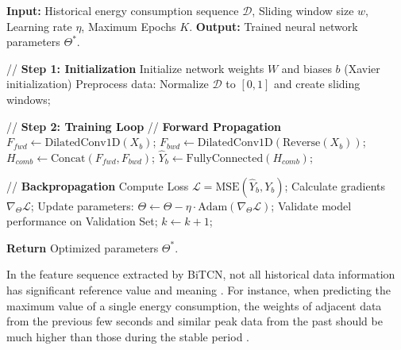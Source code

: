 \documentclass[conference]{{IEEEtran}}
\begin{document}
\begin{algorithm}[!t] 
\caption{Training Process of the BiTCN Energy Consumption Prediction Model}
\label{alg:bitcn_training}
\begin{algorithmic}[1]
\State \textbf{Input:} Historical energy consumption sequence $\mathcal{D}$, Sliding window size $w$, Learning rate $\eta$, Maximum Epochs $K$.
\State \textbf{Output:} Trained neural network parameters $\Theta^*$.

// \textbf{Step 1: Initialization}
\State Initialize network weights $W$ and biases $b$ (Xavier initialization)
\State Preprocess data: Normalize $\mathcal{D}$ to $[0, 1]$ and create sliding windows;

// \textbf{Step 2: Training Loop}
        \State // \textbf{Forward Propagation}
        \State $F_{fwd} \leftarrow \text{DilatedConv1D}(X_b)$; 
        \State $F_{bwd} \leftarrow \text{DilatedConv1D}(\text{Reverse}(X_b))$; 
        \State $H_{comb} \leftarrow \text{Concat}(F_{fwd}, F_{bwd})$; 
        \State $\hat{Y}_b \leftarrow \text{FullyConnected}(H_{comb})$;
        
        \State // \textbf{Backpropagation}
        \State Compute Loss $\mathcal{L} = \text{MSE}(\hat{Y}_b, Y_b)$;
        \State Calculate gradients $\nabla_\Theta \mathcal{L}$;
        \State Update parameters: $\Theta \leftarrow \Theta - \eta \cdot \text{Adam}(\nabla_\Theta \mathcal{L})$;
    \EndFor
    \State Validate model performance on Validation Set;
    \State $k \leftarrow k + 1$;
\EndWhile

\State \textbf{Return} Optimized parameters $\Theta^*$.
\end{algorithmic}
\end{algorithm}

In the feature sequence extracted by BiTCN, not all historical data information has significant reference value and meaning \cite{song2024predicting}. For instance, when predicting the maximum value of a single energy consumption, the weights of adjacent data from the previous few seconds and similar peak data from the past should be much higher than those during the stable period \cite{bi2023network}.
\end{document}
